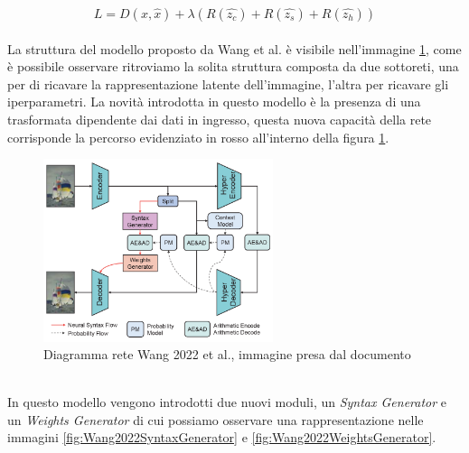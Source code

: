 \begin{equation}\label{eq:wang2022Loss}
    L = D(x,\hat{x}) + \lambda (R(\hat{z_{c}}) +  R(\hat{z_{s}}) + R(\hat{z_{h}}))
\end{equation}\\
La struttura del modello proposto da Wang et al. è visibile nell’immagine \ref{fig:Wang2022Network}, come è possibile osservare ritroviamo la solita struttura composta da due sottoreti, una per di ricavare la rappresentazione latente dell’immagine, l’altra per ricavare gli iperparametri. La novità introdotta in questo modello è la presenza di una trasformata dipendente dai dati in ingresso, questa nuova capacità della rete corrisponde la percorso evidenziato in rosso all’interno della figura \ref{fig:Wang2022Network}.\\
\begin{figure}[!h]
    \centering
    \includegraphics[width=0.6\textwidth]{Immagini/Wang2022_Rete.png}
    \caption{Diagramma rete Wang 2022 et al., immagine presa dal documento \cite{wang2022neural}}
    \label{fig:Wang2022Network}
\end{figure}\\
In questo modello vengono introdotti due nuovi moduli, un \textit{Syntax Generator} e un \textit{Weights Generator} di cui possiamo osservare una rappresentazione nelle immagini \ref{fig:Wang2022SyntaxGenerator} e \ref{fig:Wang2022WeightsGenerator}.\\

